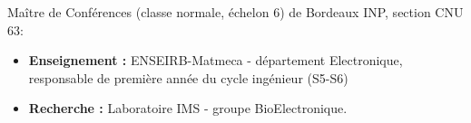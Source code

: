 

\begin{cvparagraph}

Maître de Conférences (classe normale, échelon 6) de Bordeaux INP, section CNU 63:
\begin{itemize}
	\item \textbf{Enseignement :} ENSEIRB-Matmeca - département Electronique, responsable de première année du cycle ingénieur (S5-S6)
	\item \textbf{Recherche :} Laboratoire IMS - groupe BioElectronique.
\end{itemize}
\end{cvparagraph}